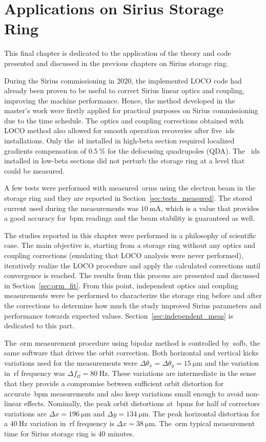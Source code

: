 \chapter{Applications on Sirius Storage Ring}

This final chapter is dedicated to the application of the theory and code presented and discussed in the previous chapters on Sirius storage ring. 

During the Sirius commissioning in 2020, the implemented LOCO code had already been proven to be useful to correct Sirius linear optics and coupling, improving the machine performance. Hence, the method developed in the master's work were firstly applied for practical purposes on Sirius commissioning due to the time schedule. The optics and coupling corrections obtained with LOCO method also allowed for smooth operation recoveries after five~\glspl{id} installations. Only the~\gls{id} installed in high-beta section required localized gradients compensation of $\SI{0.5}{\%}$ for the defocusing quadrupoles (QDA). The ~\glspl{id} installed in low-beta sections did not perturb the storage ring at a level that could be measured. 

A few tests were performed with measured~\glspl{orm} using the electron beam in the storage ring and they are reported in Section~\ref{sec:tests_measured}. The stored current used during the measurements was $\SI{10}{\milli\ampere}$, which is a value that provides a good accuracy for~\gls{bpm} readings and the beam stability is guaranteed as well.

The studies reported in this chapter were performed in a philosophy of scientific case. The main objective is, starting from a storage ring without any optics and coupling corrections (emulating that LOCO analysis were never performed), iteratively realize the LOCO procedure and apply the calculated corrections until convergence is reached. The results from this process are presented and discussed in Section~\ref{sec:orm_fit}. From this point, independent optics and coupling measurements were be performed to characterize the storage ring before and after the corrections to determine how much the study improved Sirius parameters and performance towards expected values. Section~\ref{sec:independent_meas} is dedicated to this part.

The~\gls{orm} measurement procedure using bipolar method is controlled by~\gls{sofb}, the same software that drives the orbit correction. Both horizontal and vertical kicks variations used for the measurements were $\Delta \theta_x = \Delta \theta_y = \SI{15}{\micro\meter}$ and the variation in~\gls{rf} frequency was $\Delta f_{\mathrm{rf}} = \SI{80}{\hertz}$. These variations are intermediate in the sense that they provide a compromise between sufficient orbit distortion for accurate~\gls{bpm} measurements and also keep variations small enough to avoid non-linear effects. Nominally, the peak orbit distortions at~\glspl{bpm} for half of correctors variations are $\Delta x = \SI{196}{\micro\meter}$ and $\Delta y = \SI{134}{\micro\meter}$. The peak horizontal distortion for a $\SI{40}{\hertz}$ variation in~\gls{rf} frequency is $\Delta x = \SI{38}{\micro\meter}$. The~\gls{orm} typical measurement time for Sirius storage ring is $40$ minutes.

